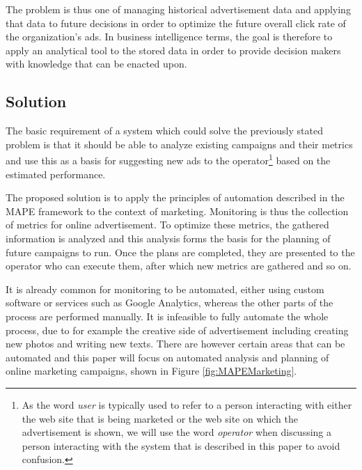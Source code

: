 \documentclass{sig-alternate}
\begin{document}
The problem is thus one of managing historical advertisement data and applying that data to future decisions in order to optimize the future overall click rate of the organization's ads. In business intelligence terms, the goal is therefore to apply an analytical tool to the stored data in order to provide decision makers with knowledge that can be enacted upon.

\subsection{Solution}
The basic requirement of a system which could solve the previously stated problem is that it should be able to analyze existing campaigns and their metrics and use this as a basis for suggesting new ads to the operator\footnote{As the word \emph{user} is typically used to refer to a person interacting with either the web site that is being marketed or the web site on which the advertisement is shown, we will use the word \emph{operator} when discussing a person interacting with the system that is described in this paper to avoid confusion.} based on the estimated performance.

The proposed solution is to apply the principles of automation described in the MAPE framework to the context of marketing. Monitoring is thus the collection of metrics for online advertisement. To optimize these metrics, the gathered information is analyzed and this analysis forms the basis for the planning of future campaigns to run. Once the plans are completed, they are presented to the operator who can execute them, after which new metrics are gathered and so on.

It is already common for monitoring to be automated, either using custom software or services such as Google Analytics, whereas the other parts of the process are performed manually. It is infeasible to fully automate the whole process, due to for example the creative side of advertisement including creating new photos and writing new texts. There are however certain areas that can be automated and this paper will focus on automated analysis and planning of online marketing campaigns, shown in Figure \ref{fig:MAPEMarketing}.
\end{document}
